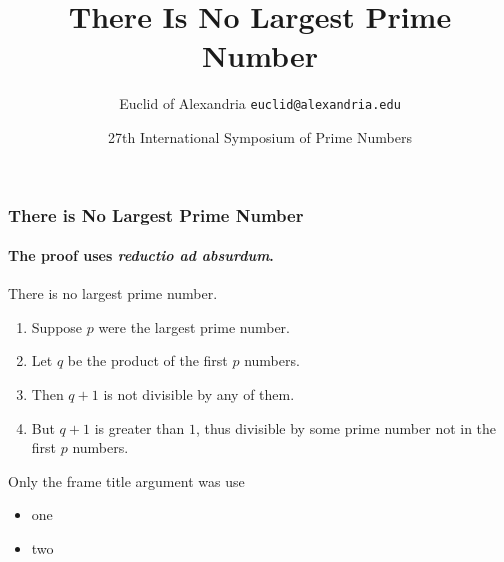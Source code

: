 \documentclass{beamer}
\title{There Is No Largest Prime Number}
\date[ISPN ’80]{27th International Symposium of Prime Numbers}
\author[Euclid]{Euclid of Alexandria \texttt{euclid@alexandria.edu}}
\begin{document}

\begin{frame}
\titlepage%
\end{frame}


\begin{frame}%
  \frametitle{\hspace{4mm}There is No Largest Prime Number}%
  \framesubtitle{\hspace{4mm}The proof uses \textit{reductio ad absurdum}.}%
  \begin{theorem}%
    There is no largest prime number.%
  \end{theorem}%
  \begin{enumerate}%
    \item<1-| alert@1> Suppose $p$ were the largest prime number.%
    \item<2-> Let $q$ be the product of the first $p$ numbers.%
    \item<3-> Then $q+1$ is not divisible by any of them.%
    \item<1-> But $q + 1$ is greater than $1$, thus divisible by some prime%
    number not in the first $p$ numbers.%
  \end{enumerate}%
\end{frame}%


\begin{frame}{\hspace{4mm}Only the frame title argument was use}%
  \begin{itemize}%
    \item one%
    \item two%
  \end{itemize}%
\end{frame}%

\end{document}
